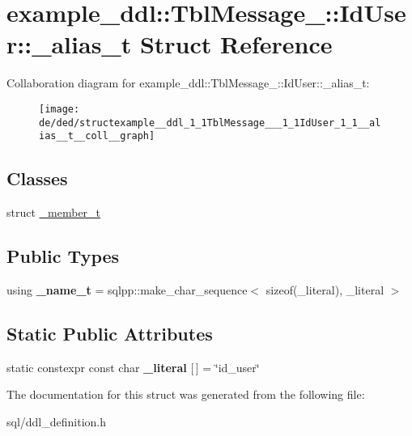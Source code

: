 \hypertarget{structexample__ddl_1_1TblMessage___1_1IdUser_1_1__alias__t}{}\section{example\+\_\+ddl\+:\+:Tbl\+Message\+\_\+\+:\+:Id\+User\+:\+:\+\_\+alias\+\_\+t Struct Reference}
\label{structexample__ddl_1_1TblMessage___1_1IdUser_1_1__alias__t}


Collaboration diagram for example\+\_\+ddl\+:\+:Tbl\+Message\+\_\+\+:\+:Id\+User\+:\+:\+\_\+alias\+\_\+t\+:
\nopagebreak
\begin{figure}[H]
\begin{center}
\leavevmode
\texttt{[image: de/ded/structexample\_\_ddl\_1\_1TblMessage\_\_\_1\_1IdUser\_1\_1\_\_alias\_\_t\_\_coll\_\_graph]}
\end{center}
\end{figure}
\subsection*{Classes}
\begin{DoxyCompactItemize}
\item 
struct \hyperlink{structexample__ddl_1_1TblMessage___1_1IdUser_1_1__alias__t_1_1__member__t}{\+\_\+member\+\_\+t}
\end{DoxyCompactItemize}
\subsection*{Public Types}
\begin{DoxyCompactItemize}
\item 
\hypertarget{structexample__ddl_1_1TblMessage___1_1IdUser_1_1__alias__t_a30f0edc5a4b4e4edfe0ce905d2542d02}{}using {\bfseries \+\_\+name\+\_\+t} = sqlpp\+::make\+\_\+char\+\_\+sequence$<$ sizeof(\+\_\+literal), \+\_\+literal $>$\label{structexample__ddl_1_1TblMessage___1_1IdUser_1_1__alias__t_a30f0edc5a4b4e4edfe0ce905d2542d02}

\end{DoxyCompactItemize}
\subsection*{Static Public Attributes}
\begin{DoxyCompactItemize}
\item 
\hypertarget{structexample__ddl_1_1TblMessage___1_1IdUser_1_1__alias__t_ac5b5e8e89b30084d75d7bd9acd237c31}{}static constexpr const char {\bfseries \+\_\+literal} \mbox{[}$\,$\mbox{]} = \char`\"{}id\+\_\+user\char`\"{}\label{structexample__ddl_1_1TblMessage___1_1IdUser_1_1__alias__t_ac5b5e8e89b30084d75d7bd9acd237c31}

\end{DoxyCompactItemize}


The documentation for this struct was generated from the following file\+:\begin{DoxyCompactItemize}
\item 
sql/ddl\+\_\+definition.\+h\end{DoxyCompactItemize}
